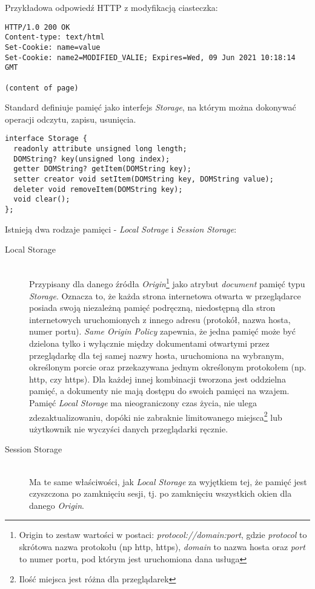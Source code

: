 Przykładowa odpowiedź HTTP z modyfikacją ciasteczka:
\lstset{language=Octave}
\begin{lstlisting}
HTTP/1.0 200 OK
Content-type: text/html
Set-Cookie: name=value
Set-Cookie: name2=MODIFIED_VALIE; Expires=Wed, 09 Jun 2021 10:18:14 GMT

(content of page)
\end{lstlisting}

Standard definiuje pamięć jako interfejs \emph{Storage}, na którym można dokonywać operacji odczytu, zapisu, usunięcia.

\lstset{language=Octave}
\begin{lstlisting}
interface Storage {
  readonly attribute unsigned long length;
  DOMString? key(unsigned long index);
  getter DOMString? getItem(DOMString key);
  setter creator void setItem(DOMString key, DOMString value);
  deleter void removeItem(DOMString key);
  void clear();
};
\end{lstlisting}

Istnieją dwa rodzaje pamięci - \emph{Local Sotrage} i \emph{Session Storage}:

\begin{description}
  \item[Local Storage] \hfill \\
  Przypisany dla danego źródła \emph{Origin}\footnote{Origin to zestaw wartości w postaci: \emph{protocol://domain:port}, gdzie \emph{protocol} to skrótowa nazwa protokołu (np http, https), \emph{domain} to nazwa hosta oraz \emph{port} to numer portu, pod którym jest uruchomiona dana usługa} jako atrybut \emph{document} pamięć typu \emph{Storage}. Oznacza to, że każda strona internetowa otwarta w przeglądarce posiada swoją niezależną pamięć podręczną, niedostępną dla stron internetowych uruchomionych z innego adresu (protokół, nazwa hosta, numer portu). \emph{Same Origin Policy} zapewnia, że jedna pamięć może być dzielona tylko i wyłącznie między dokumentami otwartymi przez przeglądarkę dla tej samej nazwy hosta, uruchomiona na wybranym, określonym porcie oraz przekazywana jednym określonym protokołem (np. http, czy https). Dla każdej innej kombinacji tworzona jest oddzielna pamięć, a dokumenty nie mają dostępu do swoich pamięci na wzajem. Pamięć \emph{Local Storage} ma nieograniczony czas życia, nie ulega zdezaktualizowaniu, dopóki nie zabraknie limitowanego miejsca\footnote{Ilość miejsca jest różna dla przeglądarek} lub użytkownik nie wyczyści danych przeglądarki ręcznie.
  \item[Session Storage] \hfill \\
  Ma te same właściwości, jak \emph{Local Storage} za wyjętkiem tej, że pamięć jest czyszczona po zamknięciu sesji, tj. po zamknięciu wszystkich okien dla danego \emph{Origin}.
\end{description}

